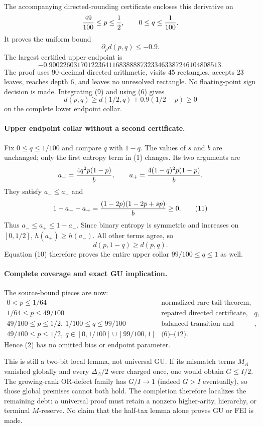 The accompanying directed-rounding certificate encloses this derivative
on
\[
 {49\over100}\le p\le{1\over2},\qquad
 0\le q\le{1\over100}.
\]
It proves the uniform bound
\[
 \boxed{\partial_p d(p,q)\le-0.9.}                    \tag{9}
\]
The largest certified upper endpoint is
\[
 -0.9002260317012236411683888873233463387246104808513.
\]
The proof uses 90-decimal directed arithmetic, visits 45 rectangles,
accepts 23 leaves, reaches depth 6, and leaves no unresolved rectangle.
No floating-point sign decision is made.  Integrating (9) and using (6)
gives
\[
 d(p,q)\ge d(1/2,q)+0.9(1/2-p)\ge0                  \tag{10}
\]
on the complete lower endpoint collar.

\paragraph{Upper endpoint collar without a second certificate.}
Fix $0\le q\le1/100$ and compare $q$ with $1-q$.  The values of $s$ and
$b$ are unchanged; only the first entropy term in (1) changes.  Its two
arguments are
\[
 a_-={4q^2p(1-p)\over b},\qquad
 a_+={4(1-q)^2p(1-p)\over b}.
\]
They satisfy $a_-\le a_+$ and
\[
 1-a_--a_+
 ={(1-2p)(1-2p+sp)\over b}\ge0.                      \tag{11}
\]
Thus $a_-\le a_+\le1-a_-$.  Since binary entropy is symmetric and
increases on $[0,1/2]$, $h(a_+)\ge h(a_-)$.  All other terms agree, so
\[
 d(p,1-q)\ge d(p,q).                                  \tag{12}
\]
Equation (10) therefore proves the entire upper collar
$99/100\le q\le1$ as well.

\paragraph{Complete coverage and exact GU implication.}
The source-bound pieces are now:
\[
\begin{array}{c|c}
0<p\le1/64 & \text{normalized rare-tail theorem},\\
1/64\le p\le49/100 & \text{repaired directed certificate, all }q,\\
49/100\le p\le1/2,\ 1/100\le q\le99/100
 & \text{balanced-transition and central-collar certificates},\\
49/100\le p\le1/2,\ q\in[0,1/100]\cup[99/100,1]
 & \text{(6)--(12).}
\end{array}
\]
Hence (2) has no omitted bias or endpoint parameter.

This is still a two-bit local lemma, not universal GU.  If its mismatch
terms $M_A$ vanished globally and every $\Delta_A/2$ were charged once,
one would obtain $G\le I/2$.  The growing-rank OR-defect family has
$G/I\to1$ (indeed $G>I$ eventually), so those global premises cannot both
hold.  The completion therefore localizes the remaining debt: a universal
proof must retain a nonzero higher-arity, hierarchy, or terminal
$M$-reserve.  No claim that the half-tax lemma alone proves GU or FEI is
made.
